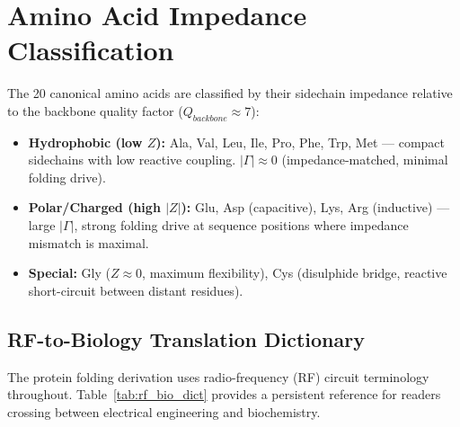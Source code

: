\section{Amino Acid Impedance Classification}

The 20 canonical amino acids are classified by their sidechain impedance relative to the backbone quality factor ($Q_{backbone} \approx 7$):

\begin{itemize}
    \item \textbf{Hydrophobic (low $Z$):} Ala, Val, Leu, Ile, Pro, Phe, Trp, Met --- compact sidechains with low reactive coupling. $|\Gamma| \approx 0$ (impedance-matched, minimal folding drive).
    \item \textbf{Polar/Charged (high $|Z|$):} Glu, Asp (capacitive), Lys, Arg (inductive) --- large $|\Gamma|$, strong folding drive at sequence positions where impedance mismatch is maximal.
    \item \textbf{Special:} Gly ($Z \approx 0$, maximum flexibility), Cys (disulphide bridge, reactive short-circuit between distant residues).
\end{itemize}

\subsection{RF-to-Biology Translation Dictionary}
\label{sec:rf_biology_dictionary}

The protein folding derivation uses radio-frequency (RF) circuit terminology throughout. Table~\ref{tab:rf_bio_dict} provides a persistent reference for readers crossing between electrical engineering and biochemistry.

